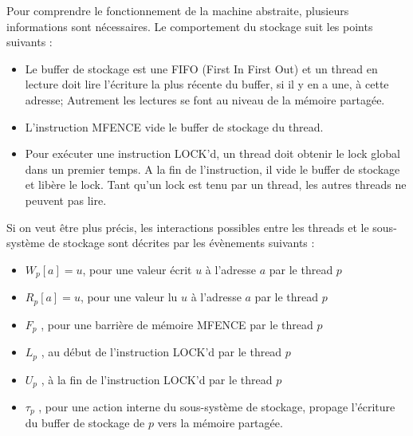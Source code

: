 \documentclass[12pt,a4paper]{article}
\begin{document}
Pour comprendre le fonctionnement de la machine abstraite, plusieurs informations sont nécessaires. Le comportement du stockage suit les points suivants :
\begin{itemize}
	\item Le buffer de stockage est une FIFO (First In First Out) et un thread en lecture doit lire l'écriture la plus récente du buffer, si il y en a une, à cette adresse; Autrement les lectures se font au niveau de la mémoire partagée.
	\item L'instruction MFENCE vide le buffer de stockage du thread.
	\item Pour exécuter une instruction LOCK'd, un thread doit obtenir le lock global dans un premier temps. A la fin de l'instruction, il vide le buffer de stockage et libère le lock. Tant qu'un lock est tenu par un thread, les autres threads ne peuvent pas lire. 
\end{itemize}
Si on veut être plus précis, les interactions possibles entre les threads et le sous-système de stockage sont décrites par les évènements suivants :

\begin{itemize}
	\item $W_p[a]=u$, pour une valeur écrit $u$ à l'adresse $a$ par le thread $p$	
	\item $R_p[a]=u$, pour une valeur lu $u$ à l'adresse $a$ par le thread $p$
	\item $F_p$ , pour une barrière de mémoire MFENCE par le thread $p$
	\item $L_p$ , au début de l'instruction LOCK'd par le thread $p$
	\item $U_p$ , à la fin de l'instruction LOCK'd par le thread $p$
	\item $\tau_p$ , pour une action interne du sous-système de stockage, propage l'écriture du buffer de stockage de $p$ vers la mémoire partagée.
\end{itemize}
\end{document}
